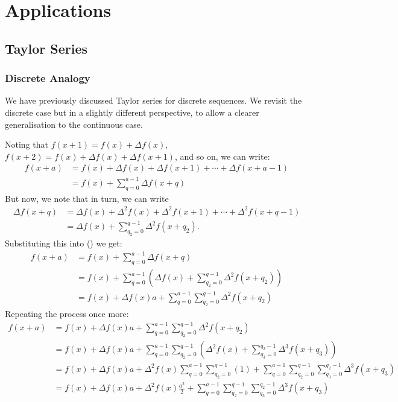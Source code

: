 \documentclass{article}
\theoremstyle{definition}
\begin{document}
\section{Applications}
\subsection{Taylor Series}
\subsubsection{Discrete Analogy}
We have previously discussed Taylor series for discrete sequences. We revisit the discrete case but in a slightly different perspective, to allow a clearer generalisation to the continuous case.\par
Noting that $f(x+1)=f(x)+\Delta f(x)$, $f(x+2)=f(x)+\Delta f(x)+\Delta f(x+1)$, and so on, we can write:
\begin{align*}
	f(x+a)&=f(x)+\Delta f(x)+\Delta f(x+1)+\cdots+\Delta f(x+a-1)\\
	&=f(x)+\sum_{q=0}^{a-1}\Delta f(x+q)
\end{align*}
But now, we note that in turn, we can write 
\begin{align*}
	\Delta f(x+q)&=\Delta f(x)+\Delta^2f(x)+\Delta^2f(x+1)+\cdots+\Delta^2f(x+q-1)\\
	&=\Delta f(x)+\sum_{q_2=0}^{q-1}\Delta^2f(x+q_2).
\end{align*}
Substituting this into () we get:
\begin{align*}
	f(x+a)&=f(x)+\sum_{q=0}^{a-1}\Delta f(x+q)\\
	&=f(x)+\sum_{q=0}^{a-1}\left(\Delta f(x)+\sum_{q_2=0}^{q-1}\Delta^2f(x+q_2)\right)\\
	&=f(x)+\Delta f(x)a+\sum_{q=0}^{a-1}\sum_{q_2=0}^{q-1}\Delta^2f(x+q_2)
\end{align*}
Repeating the process once more:
\begin{align*}
	f(x+a)&=f(x)+\Delta f(x)a+\sum_{q=0}^{a-1}\sum_{q_2=0}^{q-1}\Delta^2f(x+q_2)\\
	&=f(x)+\Delta f(x)a+\sum_{q=0}^{a-1}\sum_{q_2=0}^{q-1}\left(\Delta^2f(x)+\sum_{q_3=0}^{q_2-1}\Delta^3f(x+q_3)\right)\\
	&=f(x)+\Delta f(x)a+\Delta^2f(x)\sum_{q=0}^{a-1}\sum_{q_2=0}^{q-1}(1)+\sum_{q=0}^{a-1}\sum_{q_2=0}^{q-1}\sum_{q_3=0}^{q_2-1}\Delta^3f(x+q_3)\\
	&=f(x)+\Delta f(x)a+\Delta^2f(x)\frac{a^{\underline{2}}}{2}+\sum_{q=0}^{a-1}\sum_{q_2=0}^{q-1}\sum_{q_3=0}^{q_2-1}\Delta^3f(x+q_3)
\end{align*}
\end{document}
